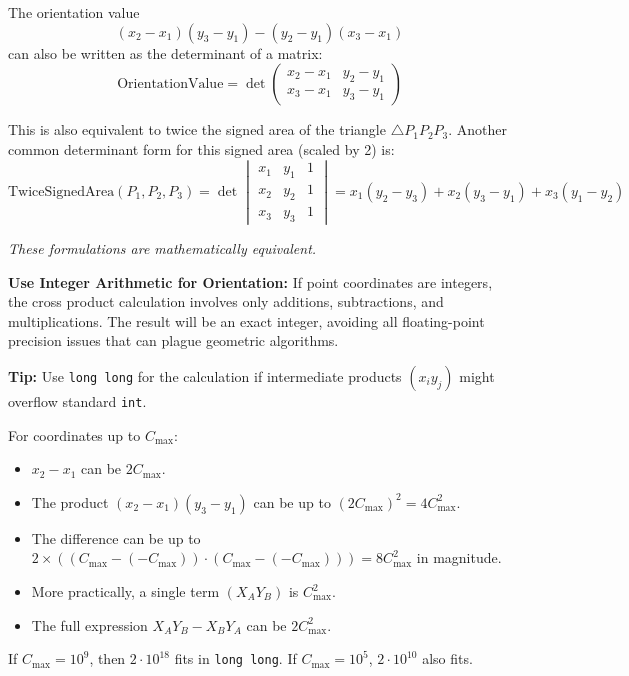 \begin{mathinsight}
\label{mathinsight:A.1.4.determinant_form}
The orientation value
\[
    (x_2-x_1)(y_3-y_1) - (y_2-y_1)(x_3-x_1)
\]
can also be written as the determinant of a matrix:
\[
    \text{OrientationValue} =
    \det \begin{pmatrix}
        x_2-x_1 & y_2-y_1 \\
        x_3-x_1 & y_3-y_1
    \end{pmatrix}
\]
\medskip

This is also equivalent to twice the signed area of the triangle $\triangle P_1P_2P_3$. Another common determinant form for this signed area (scaled by 2) is:
\[
    \text{TwiceSignedArea}(P_1, P_2, P_3) =
    \det \begin{vmatrix}
        x_1 & y_1 & 1 \\
        x_2 & y_2 & 1 \\
        x_3 & y_3 & 1
    \end{vmatrix}
    = x_1(y_2-y_3) + x_2(y_3-y_1) + x_3(y_1-y_2)
\]
\medskip

\noindent
\emph{These formulations are mathematically equivalent.}
\end{mathinsight}

\begin{tipsbox}
\label{tips:A.1.4.integer_arithmetic}
\textbf{Use Integer Arithmetic for Orientation:}
If point coordinates are integers, the cross product calculation involves only additions, subtractions, and multiplications. The result will be an exact integer, avoiding all floating-point precision issues that can plague geometric algorithms.

\medskip

\noindent
\textbf{Tip:} Use \texttt{long long} for the calculation if intermediate products $(x_i y_j)$ might overflow standard \texttt{int}.

\medskip

\noindent
For coordinates up to $C_{\max}$:
\begin{itemize}
    \item $x_2-x_1$ can be $2C_{\max}$.
    \item The product $(x_2-x_1)(y_3-y_1)$ can be up to $(2C_{\max})^2 = 4C_{\max}^2$.
    \item The difference can be up to $2 \times ( (C_{\max} - (-C_{\max})) \cdot (C_{\max} - (-C_{\max})) ) = 8C_{\max}^2$ in magnitude.
    \item More practically, a single term $(X_A Y_B)$ is $C_{\max}^2$.
    \item The full expression $X_A Y_B - X_B Y_A$ can be $2C_{\max}^2$.
\end{itemize}

\noindent
If $C_{\max}=10^9$, then $2 \cdot 10^{18}$ fits in \texttt{long long}. If $C_{\max}=10^5$, $2 \cdot 10^{10}$ also fits.
\end{tipsbox}

